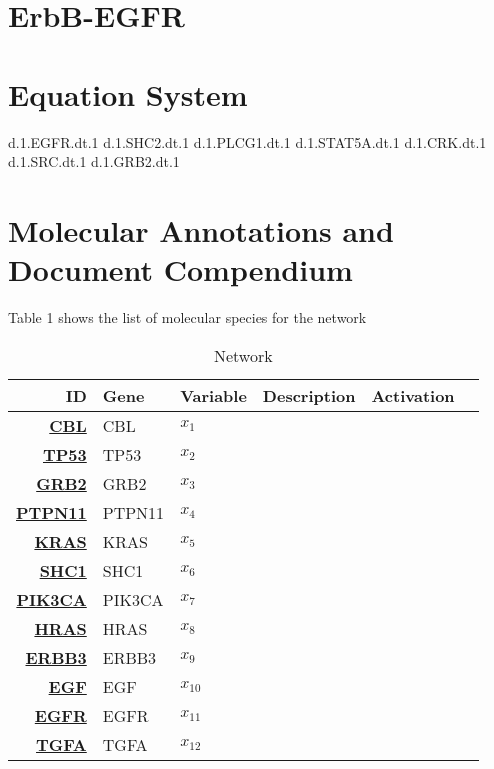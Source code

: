 
\section{ErbB-EGFR}

\section{Equation System}

d.1.EGFR.dt.1 
d.1.SHC2.dt.1 
d.1.PLCG1.dt.1 
d.1.STAT5A.dt.1 
d.1.CRK.dt.1 
d.1.SRC.dt.1 
d.1.GRB2.dt.1  


\section{Molecular Annotations and Document Compendium}

Table 1 shows the list of molecular species for the network
\vspace{8pt}
\begin{table}[H]
	\begin{tabular}{rlllll}
		\hline
		ID & Gene & Variable & Description & Activation \\ 
		\hline
		\href{https://www.malacards.org/search/results/CBL}{\textbf{CBL}} & CBL & $x_1$ & & \\
		\href{https://www.malacards.org/search/results/TB53}{\textbf{TP53}} & TP53 & $x_2$ & & \\
		\href{https://www.malacards.org/search/results/GRB2}{\textbf{GRB2}} & GRB2 & $x_3$ & & \\
		\href{https://www.malacards.org/search/results/PTPN11}{\textbf{PTPN11}} & PTPN11 & $x_4$ & & \\ 
		\href{https://www.malacards.org/search/results/KRAS}{\textbf{KRAS}} & KRAS & $x_5$ & & \\
		\href{https://www.malacards.org/search/results/SHC1}{\textbf{SHC1}} & SHC1 & $x_6$ & & \\
		\href{https://www.malacards.org/search/results/PIK3CA}{\textbf{PIK3CA}} & PIK3CA & $x_7$ & & \\ 
		\href{https://www.malacards.org/search/results/HRAS}{\textbf{HRAS}} & HRAS & $x_8$ & & \\
		\href{https://www.malacards.org/search/results/ERBB3}{\textbf{ERBB3}} & ERBB3 & $x_9$ & & \\
		\href{https://www.malacards.org/search/results/EGF}{\textbf{EGF}} & EGF & $x_{10}$ & & \\
		\href{https://www.malacards.org/search/results/EGFR}{\textbf{EGFR}} & EGFR & $x_{11}$ & & \\
		\href{https://www.malacards.org/search/results/TGFA}{\textbf{TGFA}} & TGFA & $x_{12}$ & & \\
		\hline
	\end{tabular}
	\caption{Network}
	\label{tab:Table2}
\end{table}









